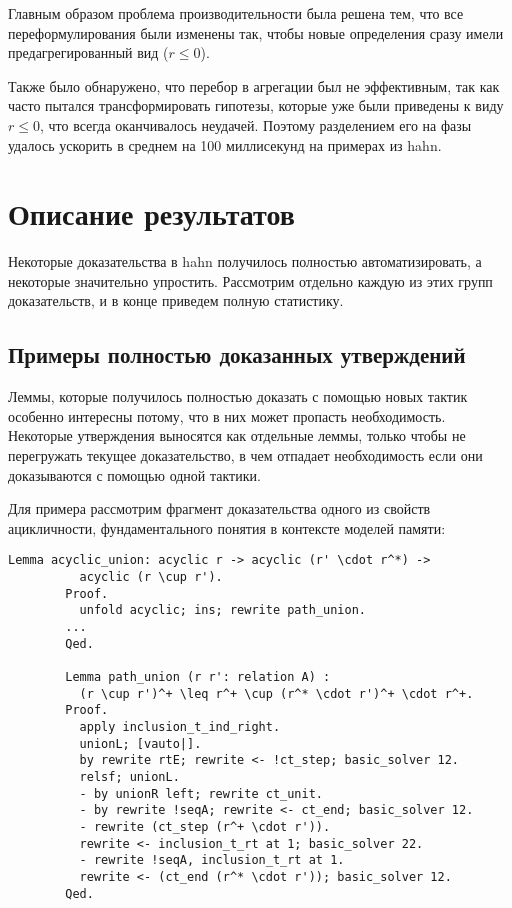 \documentclass[times
              ,specification
              ,annotation
              ]{itmo-student-thesis}
\begin{document}
      Главным образом проблема производительности была решена тем, что все переформулирования были
      изменены так, чтобы новые определения сразу имели предагрегированный вид ($r \leq 0$).

      Также было обнаружено, что перебор в агрегации был не эффективным, так как часто пытался
      трансформировать гипотезы, которые уже были приведены к виду $r \le 0$, что всегда оканчивалось
      неудачей. Поэтому разделением его на фазы удалось ускорить  в среднем на 100
      миллисекунд на примерах из hahn. 

  \section{Описание результатов}

  
    Некоторые доказательства в hahn получилось полностью автоматизировать, а некоторые значительно
    упростить. Рассмотрим отдельно каждую из этих групп доказательств, и в конце приведем полную
    статистику.

    \subsection{Примеры полностью доказанных утверждений}

      Леммы, которые получилось полностью доказать с помощью новых тактик особенно интересны
      потому, что в них может пропасть необходимость. Некоторые утверждения выносятся как отдельные
      леммы, только чтобы не перегружать текущее доказательство, в чем отпадает необходимость если они
      доказываются с помощью одной тактики.

      Для примера рассмотрим фрагмент доказательства одного из свойств ацикличности, фундаментального
      понятия в контексте моделей памяти:

      \begin{lstlisting}[float=false, gobble=8]
        Lemma acyclic_union: acyclic r -> acyclic (r' \cdot r^*) ->
          acyclic (r \cup r').
        Proof.
          unfold acyclic; ins; rewrite path_union.
        ...
        Qed.

        Lemma path_union (r r': relation A) :
          (r \cup r')^+ \leq r^+ \cup (r^* \cdot r')^+ \cdot r^+.
        Proof.
          apply inclusion_t_ind_right.
          unionL; [vauto|].
          by rewrite rtE; rewrite <- !ct_step; basic_solver 12.
          relsf; unionL.
          - by unionR left; rewrite ct_unit.
          - by rewrite !seqA; rewrite <- ct_end; basic_solver 12.
          - rewrite (ct_step (r^+ \cdot r')).
          rewrite <- inclusion_t_rt at 1; basic_solver 22.
          - rewrite !seqA, inclusion_t_rt at 1.
          rewrite <- (ct_end (r^* \cdot r')); basic_solver 12.
        Qed.
      \end{lstlisting}
\end{document}
